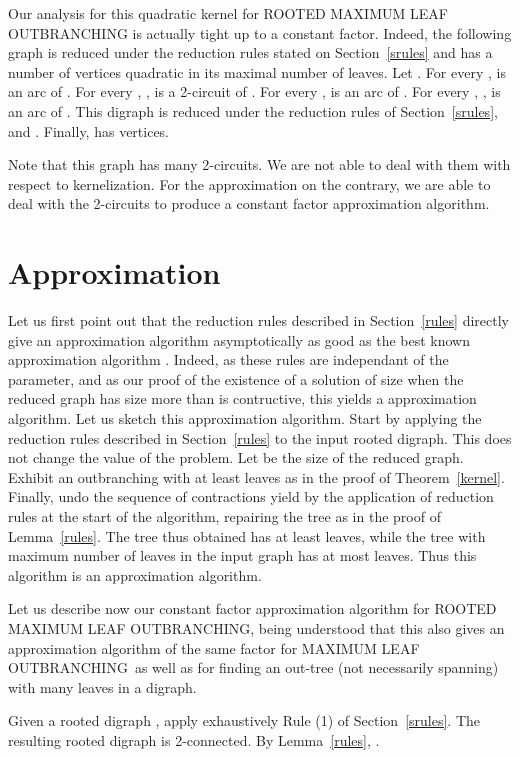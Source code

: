 \documentclass{article}
\def\RMO{R{\footnotesize{OOTED}} M{\footnotesize{AXIMUM}} L{\footnotesize{EAF}} O{\footnotesize{UTBRANCHING}} }
\def\RMOD{R{\footnotesize{OOTED}} M{\footnotesize{AXIMUM}} L{\footnotesize{EAF}} O{\footnotesize{UTBRANCHING}}, }
\def\MO{M{\footnotesize{AXIMUM}} L{\footnotesize{EAF}} O{\footnotesize{UTBRANCHING}}}
\begin{document}
Our analysis for this quadratic kernel for \RMO is actually tight up to a constant factor.
Indeed, the following graph  is reduced under the reduction rules stated on Section~\ref{srules} and has a number of vertices quadratic in its maximal number of leaves. Let  . For every ,  is an arc of . For every , ,  is a 2-circuit of . For every ,  is an arc of . For every , ,  is an arc of . This digraph  is reduced under the reduction rules of Section~\ref{srules}, and . Finally,  has  vertices. 


Note that this graph has many 2-circuits. We are not able to deal with them with respect to kernelization. For the approximation on the contrary, we are able to deal with the 2-circuits to produce a constant factor approximation algorithm.





\section{Approximation}\label{approx}
Let us first point out that the reduction rules described in Section~\ref{rules} directly give an approximation algorithm asymptotically as good as the best known approximation algorithm \cite{DrescherMaxLeaf}. Indeed, as these rules are independant of the parameter, and as our proof of the existence of a solution of size  when the reduced graph has size more than  is contructive, this yields a  approximation algorithm. Let us sketch this approximation algorithm. Start by applying the reduction rules described in Section~\ref{rules} to the input rooted digraph. This does not change the value of the problem. Let  be the size of the reduced graph. Exhibit an outbranching with at least  leaves as in the proof of Theorem~\ref{kernel}. Finally, undo the sequence of contractions yield by the application of reduction rules at the start of the algorithm, repairing the tree as in the proof of Lemma~\ref{rules}. The tree thus obtained has at least  leaves, while the tree with maximum number of leaves in the input graph has at most  leaves. Thus this algorithm is an  approximation algorithm.


Let us describe now our constant factor approximation algorithm for \RMOD being understood that this also gives an approximation algorithm of the same factor for \MO ~as well as for finding an out-tree (not necessarily spanning) with many leaves in a digraph.

Given a rooted digraph , apply exhaustively Rule (1) of Section~\ref{srules}. The resulting rooted digraph  is 2-connected. By Lemma~\ref{rules}, .
\end{document}
